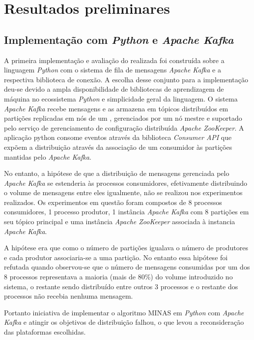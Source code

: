 \section{Resultados preliminares}\label{sec:resultados}

\newcommand{\kafka}{\emph{Apache Kafka}\xspace}
\newcommand{\python}{\emph{Python}\xspace}

\subsection{Implementação com \python e \kafka}

A primeira implementação e avaliação do \mfog realizada foi construída sobre a
linguagem \python com o sistema de fila de mensagens \kafka e a respectiva
biblioteca de conexão.
A escolha desse conjunto para a implementação deu-se devido a ampla
disponibilidade de bibliotecas de aprendizagem de máquina no ecossistema
\python e simplicidade geral da linguagem.
O sistema \kafka recebe mensagens e as armazena em tópicos distribuídos em
partições replicadas em nós de um \cluster, gerenciados por um nó mestre e
suportado pelo serviço de gerenciamento de configuração distribuída \emph{Apache
ZooKeeper}.
A aplicação python consome eventos através da biblioteca \emph{Consumer API}
que expõem a distribuição através da associação de um consumidor às partições
mantidas pelo \kafka.

No entanto, a hipótese de que a distribuição de mensagens gerenciada pelo \kafka
se estenderia às processos consumidores, efetivamente distribuindo o volume de
mensagens entre eles igualmente, não se realizou nos experimentos realizados.
Os experimentos em questão foram compostos de 8 processos consumidores, 1
processo produtor, 1 instância \kafka com 8 partições em seu tópico principal
e uma instância \emph{Apache ZooKeeper} associada à instancia \kafka.

A hipótese era que como o número de partições igualava o número de produtores e
cada produtor associaria-se a uma partição.
No entanto essa hipótese foi refutada quando observou-se que o número de
mensagens consumidas por um dos 8 processos representava a maioria (mais de
80\%) do volume introduzido no sistema, o restante sendo distribuído entre
outros 3 processos e o restante dos processos não recebia nenhuma mensagem.

Portanto iniciativa de implementar o algoritmo MINAS em \python com \kafka e
atingir os objetivos de distribuição falhou, o que levou a reconsideração das
plataformas escolhidas.

